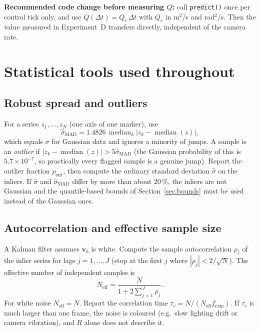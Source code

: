 \documentclass[11pt,a4paper]{article}
\begin{document}
\begin{notebox}
\textbf{Recommended code change before measuring $Q$:} call
\texttt{predict()} once per control tick only, and use
$Q(\Delta t)=Q_c\,\Delta t$ with $Q_c$ in m$^2$/s and rad$^2$/s. Then the
value measured in Experiment~D transfers directly, independent of the
camera rate.
\end{notebox}

\section{Statistical tools used throughout}
\label{sec:stats}

\subsection{Robust spread and outliers}
For a series $z_1,\dots,z_N$ (one axis of one marker), use
\begin{equation}
  \hat\sigma_\text{MAD} = 1.4826\,\operatorname{median}_k\bigl|z_k-\operatorname{median}(z)\bigr|,
\end{equation}
which equals $\sigma$ for Gaussian data and ignores a minority of jumps.
A sample is an \emph{outlier} if $|z_k-\operatorname{median}(z)|>5\hat\sigma_\text{MAD}$
(the Gaussian probability of this is $5.7\times10^{-7}$, so practically every flagged
sample is a genuine jump). Report the outlier fraction $p_\text{out}$, then
compute the ordinary standard deviation $\hat\sigma$ on the inliers. If
$\hat\sigma$ and $\hat\sigma_\text{MAD}$ differ by more than about 20\,\%,
the inliers are not Gaussian and the quantile-based bounds of
Section~\ref{sec:bounds} must be used instead of the Gaussian ones.

\subsection{Autocorrelation and effective sample size}
A Kalman filter assumes $\bm{v}_k$ is white. Compute the sample
autocorrelation $\rho_j$ of the inlier series for lags $j=1,\dots,J$
(stop at the first $j$ where $|\rho_j|<2/\sqrt N$). The effective number
of independent samples is
\begin{equation}
  N_\text{eff} = \frac{N}{1+2\sum_{j=1}^{J}\rho_j}.
  \label{eq:neff}
\end{equation}
For white noise $N_\text{eff}=N$. Report the correlation time
$\tau_c = N/(N_\text{eff} f_\text{cam})$. If $\tau_c$ is much larger than one frame,
the noise is coloured (e.g.\ slow lighting drift or camera vibration), and
$R$ alone does not describe it.
\end{document}
